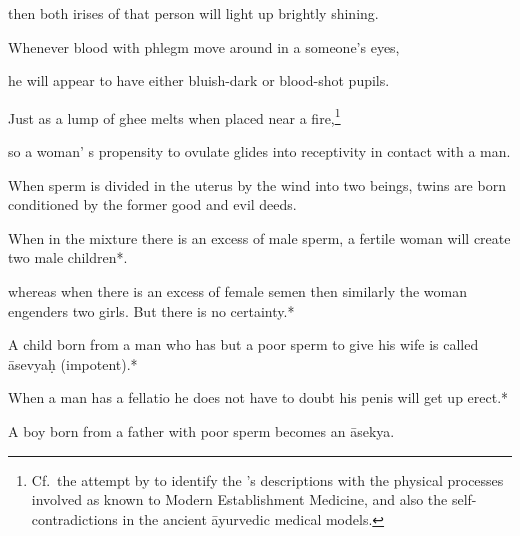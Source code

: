 \begin{translation}
\begin{tt}
then both irises of that person will light up brightly shining. 
  
\item[36g]

Whenever blood with phlegm move around in a someone’s eyes,
  
\item[36h]

he will appear to have either bluish-dark or blood-shot pupils. 
  
\item[36i]

Just as a lump of ghee melts when placed near a fire,\footnote{Cf.\ the attempt 
by \citet[222--241]{das-2003} to identify the \SS's descriptions with the physical 
processes involved as known to Modern Establishment Medicine, and also the 
self-contradictions in the ancient āyurvedic medical models.}
  
\item[36j]

so a woman’ s propensity to ovulate glides into receptivity in contact 
  with a man.  
  
\item[37]

When sperm is divided in the uterus by the wind into two beings, twins 
  are born conditioned by the former good and evil deeds.  
  
\item[37.1]

When in the mixture there is an excess of male sperm, a fertile woman 
  will create two male children*.
  
\item[37.2]

whereas when there is an excess of female semen then similarly the 
  woman engenders two girls. But there is no certainty.*
  
\item[37.3]

 A child born from a man who has but a poor sperm to give his wife is 
  called āsevyaḥ (impotent).*
  
\item[38cd]

When a man has a fellatio he does not have to doubt his penis will get 
  up erect.*
  
\item[38]

 A boy born from a father with poor sperm becomes an āsekya.
  
\item[39]


\end{tt}
\end{translation}
